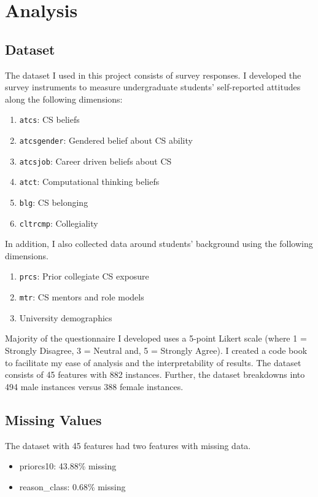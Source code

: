 
\chapter*{Analysis}

\section* {Dataset}
The dataset I used in this project consists of survey responses. I developed the survey instruments to measure undergraduate students' self-reported attitudes along the following dimensions:

\begin{enumerate}%
\item \texttt{atcs}: CS beliefs
\item \texttt{atcsgender}: Gendered belief about CS ability
\item \texttt{atcsjob}: Career driven beliefs about CS
\item \texttt{atct}: Computational thinking beliefs
\item \texttt{blg}: CS belonging
\item \texttt{cltrcmp}: Collegiality
\end{enumerate}

In addition, I also collected data around students' background using the following dimensions.

\begin{enumerate}%
\item \texttt{prcs}: Prior collegiate CS exposure
\item \texttt{mtr}: CS mentors and role models
\item University demographics
\end{enumerate}
Majority of the questionnaire I developed uses a 5-point Likert scale (where 1 = Strongly Disagree, 3 = Neutral and, 5 = Strongly Agree). I created a code book to facilitate my ease of analysis and the interpretability of results. The dataset consists of 45 features with 882 instances. Further, the dataset breakdowns into 494 male instances versus 388 female instances.

\section*{Missing Values}
The dataset with 45 features had two features with missing data.
\begin {itemize}    
\item priorcs10:                    43.88\% missing
\item reason\_class:                 0.68\% missing
\end{itemize} 


